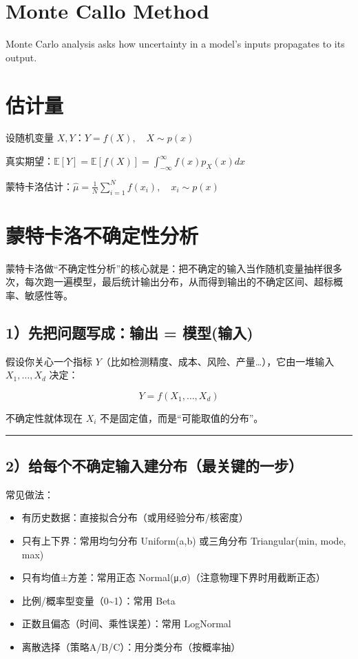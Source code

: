 \section{Monte Callo Method}

Monte Carlo analysis asks how uncertainty in a model's inputs propagates to its output.

\section{估计量}

设随机变量 \(X,Y\)：\(Y=f(X),\quad X\sim p(x)\)

真实期望：\(\mathbb E[Y]=\mathbb E[f(X)]=\int_{-\infty}^{\infty} f(x)p_X(x)dx\)

蒙特卡洛估计：\(\boxed{ \hat{\mu}=\frac{1}{N}\sum_{i=1}^{N} f(x_i), \quad x_i\sim p(x) }\)

\section{蒙特卡洛不确定性分析}

蒙特卡洛做“不确定性分析”的核心就是：把不确定的输入当作随机变量抽样很多次，每次跑一遍模型，最后统计输出分布，从而得到输出的不确定区间、超标概率、敏感性等。

\subsection{1）先把问题写成：输出 = 模型(输入)}

假设你关心一个指标 \(Y\)（比如检测精度、成本、风险、产量…），它由一堆输入 \(X_1,\dots,X_d\) 决定：

\[
Y = f(X_1,\dots,X_d)
\]

不确定性就体现在 \(X_i\) 不是固定值，而是“可能取值的分布”。

\hrule

\subsection{2）给每个不确定输入建分布（最关键的一步）}

常见做法：

\begin{itemize}
  \item 有历史数据：直接拟合分布（或用经验分布/核密度）
  \item 只有上下界：常用均匀分布 Uniform(a,b) 或三角分布 Triangular(min, mode, max)
  \item 只有均值±方差：常用正态 Normal(μ,σ)（注意物理下界时用截断正态）
  \item 比例/概率型变量（0\textasciitilde{}1）：常用 Beta
  \item 正数且偏态（时间、乘性误差）：常用 LogNormal
  \item 离散选择（策略A/B/C）：用分类分布（按概率抽）
\end{itemize}

